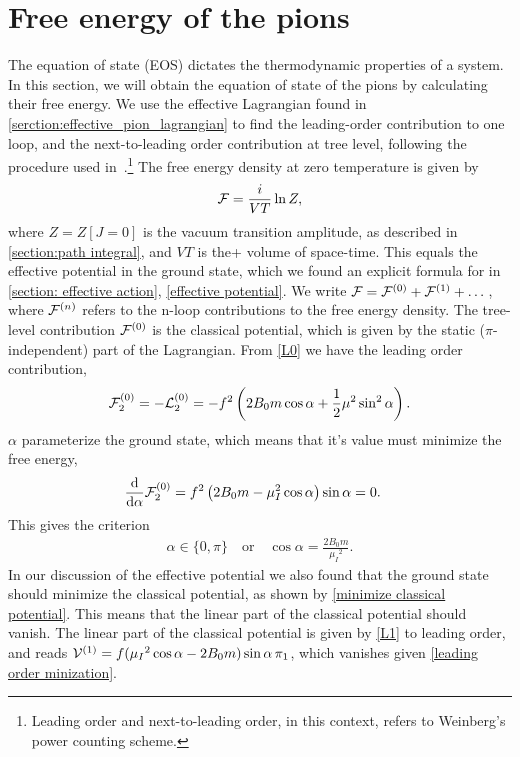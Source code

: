 \section{Free energy of the pions}

The equation of state (EOS) dictates the thermodynamic properties of a system.
In this section, we will obtain the equation of state of the pions by calculating their free energy.
We use the effective Lagrangian found in \autoref{serction:effective_pion_lagrangian} to find the leading-order contribution to one loop, and the next-to-leading order contribution at tree level, following the procedure used in~\cite{mojahed, Andersen:two-flavor-chpt}.\footnote{Leading order and next-to-leading order, in this context, refers to Weinberg's power counting scheme.}
The free energy density at zero temperature is given by
\begin{equation}
    \mathcal{F} = \frac{i}{VT} \ln Z,
\end{equation}
where $Z = Z[J=0]$ is the vacuum transition amplitude, as described in \autoref{section:path integral}, and $VT$ is the+ volume of space-time.
This equals the effective potential in the ground state, which we found an explicit formula for in \autoref{section: effective action}, \cref{effective potential}.
We write $\mathcal{F} = \mathcal{F}^{(0)} + \mathcal{F}^{(1)} + \dots$, where $\mathcal{F}^{(n)}$ refers to the n-loop contributions to the free energy density.
The tree-level contribution $\mathcal{F}^{(0)}$ is the classical potential, which is given by the static ($\pi$-independent) part of the Lagrangian.
From \cref{L0} we have the leading order contribution,
\begin{equation}
    \mathcal{F}_2^{(0)}
    = - \mathcal{L}_2^{(0)} 
    = 
    -f^2   
    \left(
        2B_0m \cos{\alpha}
        + \frac{1}{2} \mu^2 \sin^2{\alpha}
    \right).
\end{equation}
$\alpha$ parameterize the ground state, which means that it's value must minimize the free energy,
\begin{align*}
    &\dv{\alpha} \mathcal{F}_2^{(0)} 
    = f^2\left(2B_0m - \mu_I^2\cos{\alpha}\right)\sin{\alpha}
    = 0.
\end{align*}
This gives the criterion
\begin{align}
    \label{leading order minization}
    \alpha \in \{0, \pi\} \quad
    \mathrm{or} \quad
    \cos{\alpha} = \frac{2B_0m}{\mu_I{}^2}.
\end{align}
In our discussion of the effective potential we also found that the ground state should minimize the classical potential, as shown by \cref{minimize classical potential}.
This means that the linear part of the classical potential should vanish.
The linear part of the classical potential is given by \autoref{L1} to leading order, and reads $\mathcal{V}^{(1)} = f(\mu_I{}^2\cos{\alpha} - 2B_0m)\sin{\alpha} \, \pi_1 $, which vanishes given \cref{leading order minization}.

